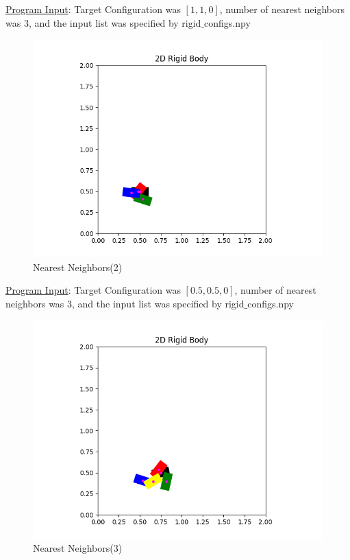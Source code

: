 \documentclass{article}
\begin{document}
\underline{Program Input}: Target Configuration was $[1, 1, 0]$, number of nearest neighbors was 3, and the input list was specified by rigid$\_$configs.npy
\newpage 
\begin{figure}[h!]
	\includegraphics[width= 0.9 \linewidth]{P2_NearestNeighbor(2).png}
	\centering
	\caption{Nearest Neighbors(2)}
	\label{P2_NearestNeighbor(2).png}
\end{figure}

\underline{Program Input}: Target Configuration was $[0.5, 0.5, 0]$, number of nearest neighbors was 3, and the input list was specified by rigid$\_$configs.npy

\newpage 
\begin{figure}[h!]
	\includegraphics[width= 0.9 \linewidth]{P2_NearestNeighbor(3).png}
	\centering
	\caption{Nearest Neighbors(3)}
	\label{P2_NearestNeighbor(3).png}
\end{figure}
\end{document}
